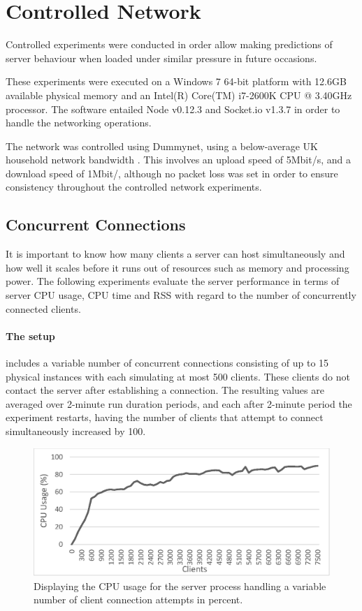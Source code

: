 \documentclass[bsc, 12pt, twoside, singlespacing, parskip, abbrevs, notimes, normalheadings, logo]{styles/infthesis}
\begin{document}
\section{Controlled Network}
Controlled experiments were conducted in order allow making predictions of server behaviour when loaded under similar pressure in future occasions.

These experiments were executed on a Windows 7 64-bit platform with 12.6GB available physical memory and an Intel(R) Core(TM) i7-2600K CPU @ 3.40GHz processor. The software entailed Node v0.12.3 and Socket.io v1.3.7 in order to handle the networking operations.

The network was controlled using Dummynet, using a below-average UK household network bandwidth \cite{household_bandwidth}. This involves an upload speed of 5Mbit/s, and a download speed of 1Mbit/, although no packet loss was set in order to ensure consistency throughout the controlled network experiments.

\subsection{Concurrent Connections}
It is important to know how many clients a server can host simultaneously and how well it scales before it runs out of resources such as memory and processing power. The following experiments evaluate the server performance in terms of server CPU usage, CPU time and RSS with regard to the number of concurrently connected clients.

\paragraph*{The setup} includes a variable number of concurrent connections consisting of up to 15 physical instances with each simulating at most 500 clients. These clients  do not contact the server after establishing a connection. The resulting values are averaged over 2-minute run duration periods, and each after 2-minute period the experiment restarts, having the number of clients that attempt to connect simultaneously increased by 100.

\begin{figure}[H]
\centering
\includegraphics[scale=0.9]{images/test_CLIENT_CPUusage.eps}
\caption{Displaying the CPU usage for the server process handling a variable number of client connection attempts in percent.}
\label{fig:cpu_usage}
\vspace{1em}
\end{figure}
\end{document}
